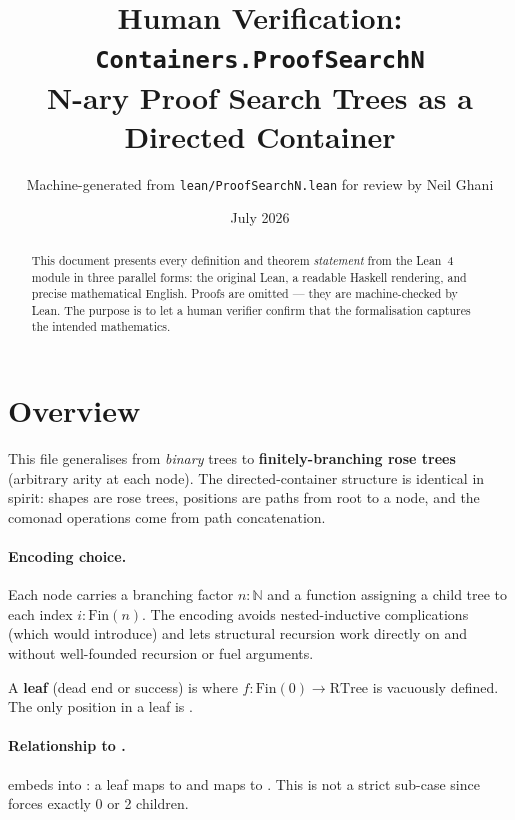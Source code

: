 \documentclass[11pt,a4paper]{article}
\title{Human Verification: \texttt{Containers.ProofSearchN}\\[4pt]
  \large N-ary Proof Search Trees as a Directed Container}
\author{Machine-generated from \texttt{lean/ProofSearchN.lean} for review by Neil Ghani}
\date{July 2026}
\begin{document}
\maketitle

\begin{abstract}
This document presents every definition and theorem \emph{statement} from the
Lean~4 module  in three parallel forms: the
original Lean, a readable Haskell rendering, and precise mathematical English.
Proofs are omitted --- they are machine-checked by Lean.  The purpose is to
let a human verifier confirm that the formalisation captures the intended
mathematics.
\end{abstract}

\tableofcontents
\bigskip

\section{Overview}

This file generalises  from \emph{binary} trees
to \textbf{finitely-branching rose trees} (arbitrary arity at each node).  The
directed-container structure is identical in spirit: shapes are rose trees,
positions are paths from root to a node, and the comonad operations come from
path concatenation.

\paragraph{Encoding choice.}
Each node carries a branching factor $n : \mathbb{N}$ and a function assigning
a child tree to each index $i : \mathrm{Fin}(n)$.  The  encoding
avoids nested-inductive complications (which  would introduce) and
lets structural recursion work directly on  and  without
well-founded recursion or fuel arguments.

A \textbf{leaf} (dead end or success) is  where
$f : \mathrm{Fin}(0) \to \mathrm{RTree}$ is vacuously defined.  The only
position in a leaf is .

\paragraph{Relationship to .}
 embeds into : a leaf maps to  and
 maps to .  This is
not a strict sub-case since  forces exactly 0 or 2 children.
\end{document}
